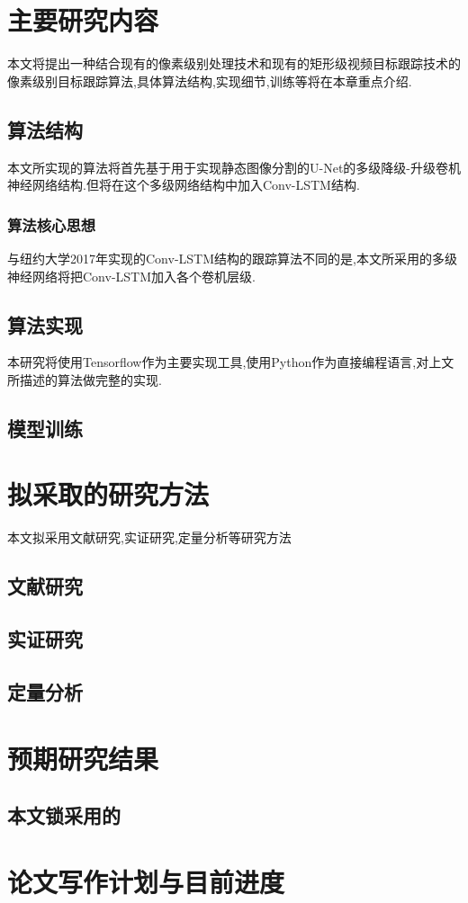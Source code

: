 
\chapter{主要研究内容}
本文将提出一种结合现有的像素级别处理技术和现有的矩形级视频目标跟踪技术的像素级别目标跟踪算法,具体算法结构,实现细节,训练等将在本章重点介绍.
\section{算法结构}
本文所实现的算法将首先基于用于实现静态图像分割的U-Net\supercite{ronneberger2015u}的多级降级-升级卷机神经网络结构.但将在这个多级网络结构中加入Conv-LSTM结构.
\subsection{算法核心思想}
与纽约大学2017年实现的Conv-LSTM结构的跟踪算法不同的是,本文所采用的多级神经网络将把Conv-LSTM加入各个卷机层级.
\section{算法实现}
本研究将使用Tensorflow作为主要实现工具,使用Python作为直接编程语言,对上文所描述的算法做完整的实现.
\section{模型训练} 

\chapter{拟采取的研究方法}
本文拟采用文献研究,实证研究,定量分析等研究方法
\section{文献研究}
\section{实证研究}
\section{定量分析}

\chapter{预期研究结果}
\section{本文锁采用的}

\chapter{论文写作计划与目前进度}

